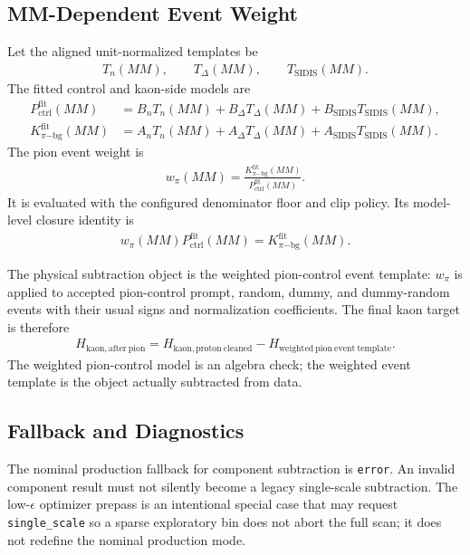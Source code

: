 \documentclass[11pt]{article}
\begin{document}
\subsection{MM-Dependent Event Weight}

Let the aligned unit-normalized templates be
\begin{align}
  T_n(MM),\qquad T_\Delta(MM),\qquad T_{\mathrm{SIDIS}}(MM).
\end{align}
The fitted control and kaon-side models are
\begin{align}
  P_{\mathrm{ctrl}}^{\mathrm{fit}}(MM)
  &=B_nT_n(MM)+B_\Delta T_\Delta(MM)
    +B_{\mathrm{SIDIS}}T_{\mathrm{SIDIS}}(MM),\\
  K_{\pi\mathrm{-bg}}^{\mathrm{fit}}(MM)
  &=A_nT_n(MM)+A_\Delta T_\Delta(MM)
    +A_{\mathrm{SIDIS}}T_{\mathrm{SIDIS}}(MM).
\end{align}
The pion event weight is
\begin{align}
  w_\pi(MM)
  =\frac{K_{\pi\mathrm{-bg}}^{\mathrm{fit}}(MM)}
         {P_{\mathrm{ctrl}}^{\mathrm{fit}}(MM)}.
\end{align}
It is evaluated with the configured denominator floor and clip policy.  Its
model-level closure identity is
\begin{align}
  w_\pi(MM)P_{\mathrm{ctrl}}^{\mathrm{fit}}(MM)
  =K_{\pi\mathrm{-bg}}^{\mathrm{fit}}(MM).
\end{align}

The physical subtraction object is the weighted pion-control event template:
$w_\pi$ is applied to accepted pion-control prompt, random, dummy, and
dummy-random events with their usual signs and normalization coefficients.
The final kaon target is therefore
\begin{align}
  H_{\mathrm{kaon,after\ pion}}
  =H_{\mathrm{kaon,proton\ cleaned}}
   -H_{\mathrm{weighted\ pion\ event\ template}}.
\end{align}
The weighted pion-control model is an algebra check; the weighted event
template is the object actually subtracted from data.

\subsection{Fallback and Diagnostics}

The nominal production fallback for component subtraction is \texttt{error}.
An invalid component result must not silently become a legacy single-scale
subtraction.  The low-$\epsilon$ optimizer prepass is an intentional special
case that may request \texttt{single\_scale} so a sparse exploratory bin does
not abort the full scan; it does not redefine the nominal production mode.
\end{document}
